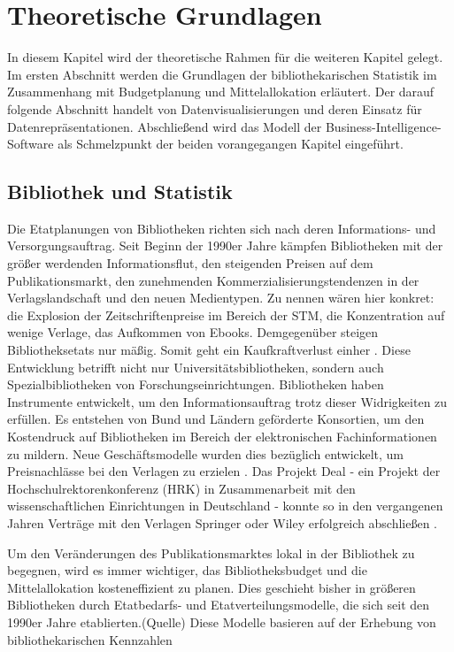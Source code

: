 \chapter{Theoretische Grundlagen}
\label{chap:two}
In diesem Kapitel wird der theoretische Rahmen für die weiteren Kapitel gelegt. Im
ersten Abschnitt werden die Grundlagen der bibliothekarischen Statistik im Zusammenhang mit Budgetplanung
und Mittelallokation erläutert. Der darauf folgende Abschnitt handelt von Datenvisualisierungen und deren Einsatz
für Datenrepräsentationen. Abschließend wird das Modell der Business-Intelligence-Software als Schmelzpunkt der 
beiden vorangegangen Kapitel eingeführt.

\section{Bibliothek und Statistik}
\label{chap:two_one}
Die Etatplanungen von Bibliotheken richten sich nach deren Informations- und Versorgungsauftrag. 
Seit Beginn der 1990er Jahre kämpfen Bibliotheken mit der größer werdenden Informationsflut, den steigenden Preisen auf dem Publikationsmarkt, 
den zunehmenden Kommerzialisierungstendenzen in der Verlagslandschaft und den neuen Medientypen. 
Zu nennen wären hier konkret: die Explosion der Zeitschriftenpreise im Bereich der \acrfull{STM}, die Konzentration auf wenige Verlage, 
das Aufkommen von Ebooks. Demgegenüber steigen Bibliotheksetats nur mäßig. 
Somit geht ein Kaufkraftverlust einher \cite[vgl.][161]{moravetz-kuhlmann_monika_erwerbungspolitik_2015}.
Diese Entwicklung betrifft nicht nur Universitätsbibliotheken, sondern auch Spezialbibliotheken von Forschungseinrichtungen.
Bibliotheken haben Instrumente entwickelt, um den Informationsauftrag trotz dieser Widrigkeiten zu erfüllen.
Es entstehen von Bund und Ländern geförderte Konsortien, um den Kostendruck auf Bibliotheken im Bereich der elektronischen
Fachinformationen zu mildern. Neue Geschäftsmodelle wurden dies bezüglich entwickelt, um Preisnachlässe bei den Verlagen zu erzielen
\cite[vgl.][169 ff.]{moravetz-kuhlmann_monika_erwerbungspolitik_2015}. Das Projekt Deal - ein Projekt der Hochschulrektorenkonferenz (HRK) in Zusammenarbeit mit den
wissenschaftlichen Einrichtungen in Deutschland - konnte so in den vergangenen Jahren Verträge mit den Verlagen Springer oder Wiley erfolgreich abschließen \cite[vgl.][]{projekt_deal_projekt_2020}.

Um den Veränderungen des Publikationsmarktes lokal in der Bibliothek zu begegnen, wird es immer wichtiger, das Bibliotheksbudget und die Mittelallokation kosteneffizient zu planen. 
Dies geschieht bisher in größeren Bibliotheken durch Etatbedarfs- und Etatverteilungsmodelle, die sich seit den 1990er Jahre etablierten.(Quelle) 
Diese Modelle basieren auf der Erhebung von bibliothekarischen Kennzahlen \cite[vgl.][172 ff.]{moravetz-kuhlmann_monika_erwerbungspolitik_2015}

